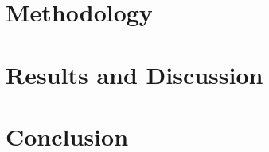\documentclass[%
a4paper,							
11pt,								
bibliography=totoc,						
abstracton=true					
]
{scrartcl}
\theoremstyle{plain}
\theoremstyle{definition}
\theoremstyle{remark}
\newcommand{\1}{\mathbbm{1}}
\begin{document}
\section{Methodology}\label{sec:Method}



\section{Results and Discussion}\label{sec:Results}



\section{Conclusion}\label{sec:Conclusion}


\newpage
\appendix

\printbibliography




\newpage
\end{document}
